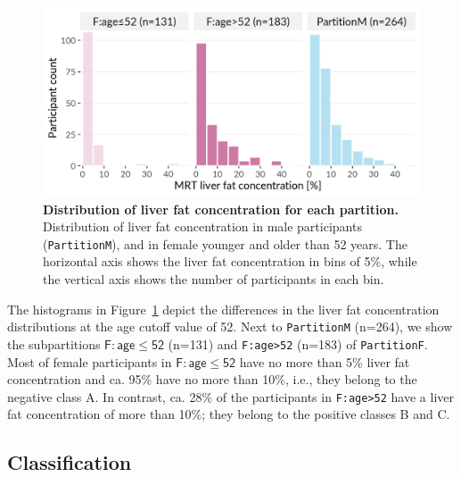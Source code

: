 \documentclass[
  oneside]{book}
\begin{document}
\begin{figure}[h]

{\centering \includegraphics[width=0.75\linewidth]{figures/03-histogram-partitions-age-liverfat} 

}

\caption{\textbf{Distribution of liver fat concentration for each partition.} Distribution of liver fat concentration in male participants (\texttt{PartitionM}), and in female younger and older than 52 years. The horizontal axis shows the liver fat concentration in bins of 5\%, while the vertical axis shows the number of participants in each bin.}\label{fig:03-histogram-partitions-age-liverfat}
\end{figure}

The histograms in Figure~\ref{fig:03-histogram-partitions-age-liverfat} depict the differences in the liver fat concentration distributions at the age cutoff value of 52.
Next to \texttt{PartitionM} (n=264), we show the subpartitions \(\mathsf{F:age\leq{}52}\) (n=131) and \texttt{F:age\textgreater{}52} (n=183) of \texttt{PartitionF}.
Most of female participants in \(\mathsf{F:age\leq{}52}\) have no more than 5\% liver fat concentration and ca. 95\% have no more than 10\%, i.e., they belong to the negative class A.
In contrast, ca. 28\% of the participants in \texttt{F:age\textgreater{}52} have a liver fat concentration of more than 10\%; they belong to the positive classes B and C.

\hypertarget{imm-workflow-classification}{%
\subsection{Classification}\label{imm-workflow-classification}}
\end{document}
